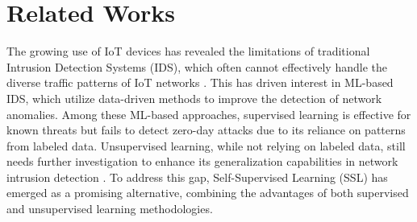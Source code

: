 \section{Related Works}
The growing use of IoT devices has revealed the limitations of traditional Intrusion Detection Systems (IDS), which often cannot effectively handle the diverse traffic patterns of IoT networks \cite{khan2022deep}. This has driven interest in ML-based IDS, which utilize data-driven methods to improve the detection of network anomalies. Among these ML-based approaches, supervised learning is effective for known threats but fails to detect zero-day attacks due to its reliance on patterns from labeled data. Unsupervised learning, while not relying on labeled data, still needs further investigation to enhance its generalization capabilities in network intrusion detection \cite{verkerken2022towards}. To address this gap, Self-Supervised Learning (SSL) has emerged as a promising alternative, combining the advantages of both supervised and unsupervised learning methodologies. 

